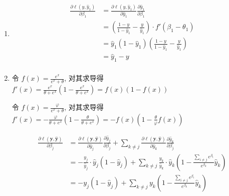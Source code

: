 \documentclass[answers]{exam}  %
\begin{document}
\begin{questions}
\begin{enumerate}
  \end{enumerate}


  \begin{solution}
    \begin{enumerate}
      \item

            $$
              \begin{aligned}
                \frac{\partial \ell(y, \hat{y}_1)}{\partial \beta_1}
                 & = \frac{\partial \ell(y, \hat{y}_1)}{\partial \hat{y}_1}\frac{\partial \hat{y}_1}{\partial \beta_1} \\
                 & = (\frac{1-y}{1-\hat{y}_1} - \frac{y}{\hat{y}_1}) \cdot f'(\beta_1 - \theta_1)                      \\
                 & = \hat{y}_1(1-\hat{y}_1)(\frac{1-y}{1-\hat{y}_1} - \frac{y}{\hat{y}_1})                             \\
                 & = \hat{y}_1 - y                                                                                     \\
              \end{aligned}
            $$

      \item

            令 $\displaystyle f(x) = \frac{e^{x}}{e^{x} + \theta}$, 对其求导得 $\displaystyle f'(x) = \frac{e^{x}}{\theta + e^{x}}(1 - \frac{e^{x}}{\theta + e^{x}}) = f(x)(1-f(x))$

            令 $\displaystyle f(x) = \frac{\varphi}{e^{x} + \theta}$, 对其求导得 $\displaystyle f'(x) = - \frac{\varphi}{\theta + e^{x}}(1 - \frac{\theta}{\theta + e^{x}}) = -f(x)(1 - \frac{\theta}{\varphi}f(x))$

            $$
              \begin{aligned}
                \frac{\partial \ell(\bm{y}, \hat{\bm{y}})}{\partial \beta_j}
                 & = \frac{\partial \ell(\bm{y}, \hat{\bm{y}})}{\partial \hat{y}_j}\frac{\partial \hat{y}_j}{\partial \beta_j} + \sum_{k \neq j}\frac{\partial \ell(\bm{y}, \hat{\bm{y}})}{\partial \hat{y}_k}\frac{\partial \hat{y}_k}{\partial \beta_j} \\
                 & = -\frac{y_j}{\hat{y}_j} \cdot \hat{y}_j(1 - \hat{y}_j) + \sum_{k \neq j} \frac{y_k}{\hat{y}_k} \cdot \hat{y}_k(1 - \frac{\sum_{i \neq j}e^{\beta_i}}{e^{\beta_k}}\hat{y}_k)                                                           \\
                 & = -y_{j} (1 - \hat{y}_j) + \sum_{k \neq j} y_{k}(1 - \frac{\sum_{i \neq j}e^{\beta_i}}{e^{\beta_k}}\hat{y}_k)                                                                                                                          \\
              \end{aligned}
            $$


\end{enumerate}
\end{solution}
\end{questions}
\end{document}
